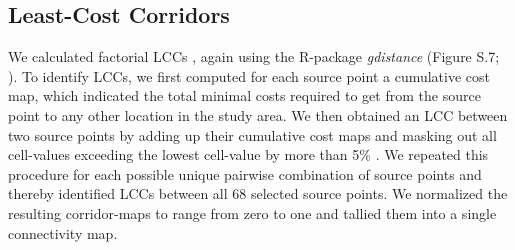 \documentclass[abstract=off,10pt,a4paper,bibliography=totocnumbered]{article}
\begin{document}
\subsection{Least-Cost Corridors}
We calculated factorial LCCs \citep{Pinto.2009, Sawyer.2011, Elliot.2014}, again
using the R-package \textit{gdistance} (Figure S.7; \citealp{vanEtten.2017}). To
identify LCCs, we first computed for each source point a cumulative cost map,
which indicated the total minimal costs required to get from the source point to
any other location in the study area. We then obtained an LCC between two source
points by adding up their cumulative cost maps and masking out all cell-values
exceeding the lowest cell-value by more than 5\% \citep{Pinto.2009}. We repeated
this procedure for each possible unique pairwise combination of source points
and thereby identified LCCs between all 68 selected source points. We normalized
the resulting corridor-maps to range from zero to one and tallied them into a
single connectivity map.
\end{document}
